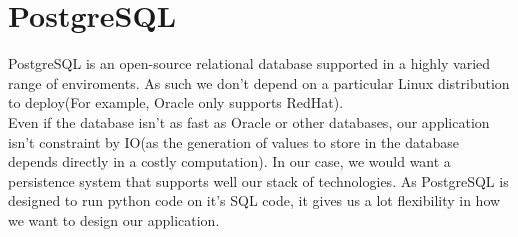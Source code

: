 \section{PostgreSQL}

PostgreSQL\cite{postgres} is an open-source relational database supported in
a highly varied range of enviroments. As such we don't depend on a particular
Linux distribution to deploy(For example, Oracle only supports RedHat).\\

Even if the database isn't as fast as Oracle or other databases, our
application isn't constraint by IO(as the generation of values to store in the
database depends directly in a costly computation). In our case, we would
want a persistence system that supports well our stack of technologies. As
PostgreSQL is designed to run python code on it's SQL code, it gives us a lot
flexibility in how we want to design our application.
